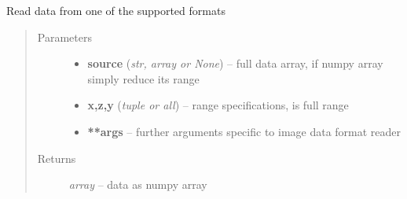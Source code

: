 \documentclass[letterpaper,10pt,english]{sphinxmanual}
\begin{document}
\begin{fulllineitems}
\label{api/ClearMap.IO:ClearMap.IO.IO.readData}
Read data from one of the supported formats
\begin{quote}\begin{description}
\item[{Parameters}] \leavevmode\begin{itemize}
\item {} 
\textbf{source} (\emph{str, array or None}) --
full data array, if numpy array simply reduce its range

\item {} 
\textbf{x,z,y} (\emph{tuple or all}) --
range specifications,  is full range

\item {} 
\textbf{**args} --
further arguments specific to image data format reader

\end{itemize}

\item[{Returns}] \leavevmode
\emph{array} --
data as numpy array

\end{description}\end{quote}




{\hyperref[api/ClearMap.IO:ClearMap.IO.IO.writeData]{\emph{}}}



\end{fulllineitems}

\end{document}
